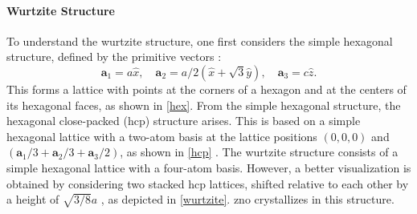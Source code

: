 \paragraph{Wurtzite Structure}
To understand the wurtzite structure, one first considers the simple hexagonal structure, defined by the primitive
vectors \autocite{Ashcroft}:
\begin{equation}
    \mathbf{a}_1 = a\hat{x}, \quad
    \mathbf{a}_2 = a/2 (\hat{x} + \sqrt{3} \hat{y}), \quad
    \mathbf{a}_3 = c \hat{z}.
    \label{eq:hex}
\end{equation}
This forms a lattice with points at the corners of a hexagon and at the centers of its hexagonal faces, as shown in \cref{hex}.
From the simple hexagonal structure, the hexagonal close-packed (hcp) structure arises.
This is based on a simple hexagonal lattice with a two-atom basis at the lattice positions $(0,0,0)$ and
$(\mathbf{a}_1/3 + \mathbf{a}_2/3 + \mathbf{a}_3/2)$, as shown in \cref{hcp} \autocite{Ashcroft}.
The wurtzite structure consists of a simple hexagonal lattice with a four-atom basis.
However, a better visualization is obtained by considering two stacked hcp lattices, shifted relative to each other by
a height of $\sqrt{3/8}a$ \autocite{Grundmann}, as depicted in \cref{wurtzite}.
\ac{zno} crystallizes in this structure.

